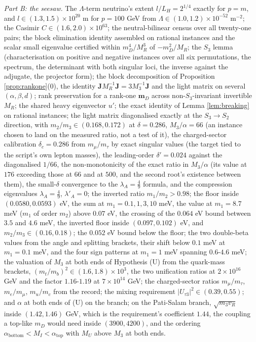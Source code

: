 \documentclass[11pt]{article}
\theoremstyle{definition}
\newcommand{\J}{\mathbf{J}}
\newcommand{\mD}{\mathbf{m}_{D}}
\newcommand{\LH}{L_{H}}
\begin{document}
\emph{Part B: the seesaw.} The $\Lambda$-term neutrino's extent $l/\LH = 2^{1/4}$ exactly for $p = m$, and $l \in (1.3, 1.5) \times 10^{20}$ m for $p = 100$ GeV from $\Lambda \in (1.0, 1.2) \times 10^{-52}$ m$^{-2}$; the Casimir $C \in (1.6, 2.0) \times 10^{63}$; the neutral-bilinear census over all twenty-one pairs; the block elimination identity assembled on rational instances and the scalar small eigenvalue certified within $m_{D}^{4}/M_{R}^{3}$ of $-m_{D}^{2}/M_{R}$; the $S_{3}$ lemma (characterisation on positive and negative instances over all six permutations, the spectrum, the determinant with both singular loci, the inverse against the adjugate, the projector form); the block decomposition of Proposition \ref{prop:rankone}(0), the identity $\J M_{R}^{-1}\J = 3M_{3}^{-1}\J$ and the light matrix on several $(\alpha, \beta, d)$; rank preservation for a rank-one $\mD$ across non-$S_{3}$-invariant invertible $M_{R}$; the shared heavy eigenvector $u'$; the exact identity of Lemma \ref{lem:breaking} on rational instances; the light matrix diagonalised exactly at the $S_{3} \to S_{2}$ direction, with $m_{2}/m_{3} \in (0.168, 0.172)$ at $\delta = 0.286$, $M_{3}/\alpha = 66$ (an instance chosen to land on the measured ratio, not a test of it), the charged-sector calibration $\delta_{c} = 0.286$ from $m_{\mu}/m_{\tau}$ by exact singular values (the target tied to the script's own lepton masses), the leading-order $\delta' = 0.024$ against the diagonalised $1/66$, the non-monotonicity of the exact ratio in $M_{3}/\alpha$ (its value at $176$ exceeding those at $66$ and at $500$, and the second root's existence between them), the small-$\delta$ convergence to the $\lambda_{A} = \tfrac49$ formula, and the compression eigenvalues $\lambda_{A} = \tfrac49$, $\lambda'_{A} = 0$; the inverted ratio $m_{1}/m_{2} > 0.98$; the floor inside $(0.0580, 0.0593)$ eV, the sum at $m_{1} = 0.1, 1, 3, 10$ meV, the value at $m_{1} = 8.7$ meV ($m_{1}$ of order $m_{2}$) above $0.07$ eV, the crossing of the $0.064$ eV bound between $3.5$ and $4.6$ meV, the inverted floor inside $(0.097, 0.102)$ eV, and $m_{2}/m_{3} \in (0.16, 0.18)$; the $0.052$ eV bound below the floor; the two double-beta values from the angle and splitting brackets, their shift below $0.1$ meV at $m_{1} = 0.1$ meV, and the four sign patterns at $m_{1} = 1$ meV spanning $0.6$-$4.6$ meV; the valuation of $M_{3}$ at both ends of Hypothesis (U) from the quark-mass brackets, $(m_{t}/m_{b})^{2} \in (1.6, 1.8) \times 10^{3}$, the two unification ratios at $2 \times 10^{16}$ GeV and the factor $1.16$-$1.19$ at $7 \times 10^{14}$ GeV; the charged-sector ratios $m_{\mu}/m_{\tau}$, $m_{e}/m_{\mu}$, $m_{u}/m_{c}$ from the record; the mixing requirement $|U_{\tau 3}|^{2} \in (0.39, 0.55)$; and $\alpha$ at both ends of (U) on the branch; on the Pati-Salam branch, $\sqrt{m_{3}v_{R}}$ inside $(1.42, 1.46)$ GeV, which is the requirement's coefficient $1.44$, the coupling a top-like $m_{D}$ would need inside $(3900, 4200)$, and the ordering $\alpha_{\mathrm{bottom}} < M_{I} < \alpha_{\mathrm{top}}$ with $M_{U}$ above $M_{3}$ at both ends.
\end{document}
